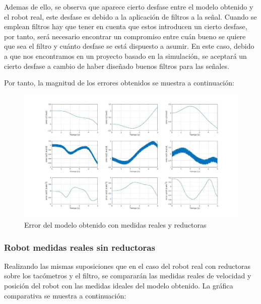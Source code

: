 Ademas de ello, se observa que aparece cierto desfase entre el modelo obtenido y el robot real, este desfase es debido a la aplicación de filtros a la señal. Cuando se emplean filtros hay que tener en cuenta que estos introducen un cierto desfase, por tanto, será necesario encontrar un compromiso entre cuán bueno se quiere que sea el filtro y cuánto desfase se está dispuesto a asumir. En este caso, debido a que nos encontramos en un proyecto basado en la simulación, se aceptará un cierto desfase a cambio de haber diseñado buenos filtros para las señales.



\newpage

Por tanto, la magnitud de los errores obtenidos se muestra a continuación:



\begin{figure}[h!]

	\centering

	\includegraphics[width=1\textwidth]{EstimacParam_SisModError_In1_RealCR}

	\caption{Error del modelo obtenido con medidas reales y reductoras}

\end{figure}



\subsubsection{Robot medidas reales sin reductoras}

Realizando las mismas suposiciones que en el caso del robot real con reductoras sobre los tacómetros y el filtro, se compararán las medidas reales de velocidad y posición del robot con las medidas ideales del modelo obtenido. La gráfica comparativa se muestra a continuación:




